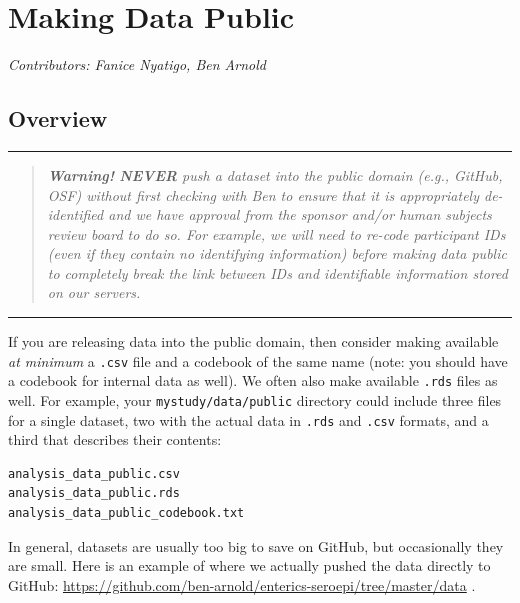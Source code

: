\documentclass[
]{book}
\begin{document}
\chapter{Making Data Public}\label{publicdata}

\emph{Contributors: Fanice Nyatigo, Ben Arnold}

\section{Overview}\label{overview-1}

\begin{center}\rule{0.5\linewidth}{0.5pt}\end{center}

\begin{quote}
\emph{\textbf{Warning! } \textbf{NEVER} push a dataset into the public domain (e.g., GitHub, OSF) without first checking with Ben to ensure that it is appropriately de-identified and we have approval from the sponsor and/or human subjects review board to do so. For example, we will need to re-code participant IDs (even if they contain no identifying information) before making data public to completely break the link between IDs and identifiable information stored on our servers. }
\end{quote}

\begin{center}\rule{0.5\linewidth}{0.5pt}\end{center}

If you are releasing data into the public domain, then consider making available \emph{at minimum} a \texttt{.csv} file and a codebook of the same name (note: you should have a codebook for internal data as well). We often also make available \texttt{.rds} files as well. For example, your \texttt{mystudy/data/public} directory could include three files for a single dataset, two with the actual data in \texttt{.rds} and \texttt{.csv} formats, and a third that describes their contents:

\begin{verbatim}
analysis_data_public.csv
analysis_data_public.rds
analysis_data_public_codebook.txt
\end{verbatim}

In general, datasets are usually too big to save on GitHub, but occasionally they are small. Here is an example of where we actually pushed the data directly to GitHub: \url{https://github.com/ben-arnold/enterics-seroepi/tree/master/data} .
\end{document}
